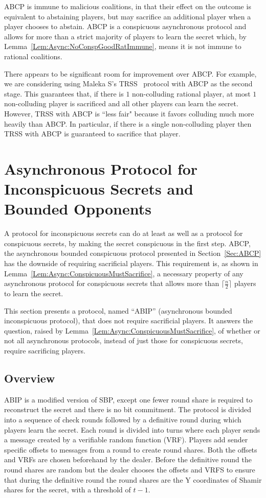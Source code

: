 \documentclass[12pt]{dalcsthesis}
\begin{document}
ABCP is immune to malicious coalitions, in that their effect on the outcome is equivalent to abstaining players, but may sacrifice an additional player when a player chooses to abstain. ABCP is a conspicuous asynchronous protocol and allows for more than a strict majority of players to learn the secret which, by Lemma~\ref{Lem:Async:NoConspGoodRatImmune}, means it is not immune to rational coalitions.

There appears to be significant room for improvement over ABCP. For example, we are considering using Maleka S's TRSS~\cite{MalekaS_08} protocol with ABCP as the second stage. This guarantees that, if there is $1$ non-colluding rational player, at most $1$ non-colluding player is sacrificed and all other players can learn the secret. However, TRSS with ABCP is ``less fair" because it favors colluding much more heavily than ABCP. In particular, if there is a single non-colluding player then TRSS with ABCP is guaranteed to sacrifice that player.



\section{Asynchronous Protocol for Inconspicuous Secrets and Bounded Opponents}
\label{Sec:ABIP}

A protocol for inconspicuous secrets can do at least as well as a protocol for conspicuous secrets, by making the secret conspicuous in the first step. ABCP, the asynchronous bounded conspicuous protocol presented in Section~\ref{Sec:ABCP} has the downside of requiring sacrificial players. This requirement is, as shown in Lemma~\ref{Lem:Async:ConspicuousMustSacrifice}, a necessary property of any asynchronous protocol for conspicuous secrets that allows more than $\lceil \frac{n}{2} \rceil$ players to learn the secret.

This section presents a protocol, named ``ABIP'' (asynchronous bounded inconspicuous protocol), that does not require sacrificial players. It answers the question, raised by Lemma~\ref{Lem:Async:ConspicuousMustSacrifice}, of whether or not all asynchronous protocols, instead of just those for conspicuous secrets, require sacrificing players.


\subsection{Overview}

ABIP is a modified version of SBP, except one fewer round share is required to reconstruct the secret and there is no bit commitment. The protocol is divided into a sequence of check rounds followed by a definitive round during which players learn the secret. Each round is divided into turns where each player sends a message created by a verifiable random function (VRF). Players add sender specific offsets to messages from a round to create round shares. Both the offsets and VRFs are chosen beforehand by the dealer. Before the definitive round the round shares are random but the dealer chooses the offsets and VRFS to ensure that during the definitive round the round shares are the Y coordinates of Shamir shares for the secret, with a threshold of $t-1$.
\end{document}
